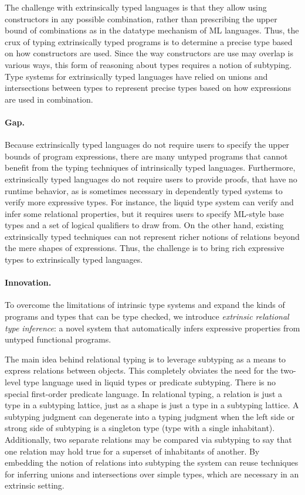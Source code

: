 \documentclass[acmsmall]{acmart}
\theoremstyle{definition}
\begin{document}
The challenge with extrinsically typed languages is that they allow using constructors
in any possible combination, rather than prescribing the upper bound of combinations as in
the datatype mechanism of ML languages. Thus, the crux of typing extrinsically typed programs is
to determine a precise type based on how constructors are used. 
Since the way constructors are use may overlap is various ways, this form of reasoning about types
requires a notion of subtyping.
Type systems for extrinsically typed languages have relied on unions and intersections between types to 
represent precise types based on how expressions are used in combination. 

\paragraph{Gap.} 
Because extrinsically typed languages do not require users to specify the upper bounds of program expressions,
there are many untyped programs that cannot benefit from the typing techniques of 
intrinsically typed languages. Furthermore, extrinsically typed languages do not require users to provide proofs,
that have no runtime behavior, as is sometimes necessary in dependently typed systems to verify more expressive types.   
For instance, the liquid type system \cite{} can verify and infer some relational properties, 
but it requires users to specify ML-style base types and a set of logical qualifiers to draw from.
On the other hand, existing extrinsically typed techniques can not represent richer notions of relations 
beyond the mere shapes of expressions.
Thus, the challenge is to bring rich expressive types to extrinsically typed languages.

\paragraph{Innovation.} 
To overcome the limitations of intrinsic type systems and expand the kinds of programs and types that can be type checked, we introduce \textit{extrinsic relational type inference}: 
a novel system that automatically infers expressive properties from untyped functional programs. 

The main idea behind relational typing is to leverage subtyping as a means to express relations
between objects. This completely obviates the need for the two-level type language
used in liquid types or predicate subtyping. There is no special first-order predicate language. 
In relational typing, a relation is just a type in a subtyping lattice, just as a shape is just  
a type in a subtyping lattice. A subtyping judgment can degenerate into a typing judgment
when the left side or strong side of subtyping is a singleton type (type with a single inhabitant).
Additionally, two separate relations may be compared via subtyping to say that one relation may hold true for a superset of inhabitants 
of another.
By embedding the notion of relations into subtyping the system can reuse techniques for inferring unions and
intersections over simple types, which are necessary in an extrinsic setting. 
\end{document}
